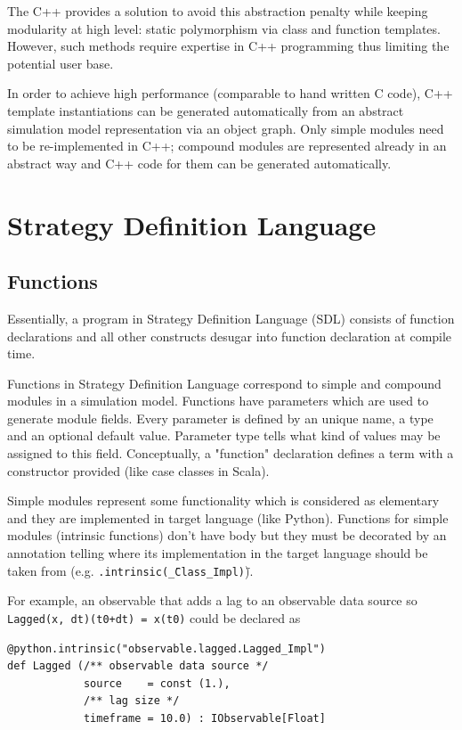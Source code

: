 \documentclass[a4paper,11pt]{article}
\begin{document}
The C++ provides a solution to avoid this abstraction penalty while keeping modularity at high level: static polymorphism via class and function templates. However, such methods require expertise in C++ programming thus limiting the potential user base.

In order to achieve high performance (comparable to hand written C code), C++ template instantiations can be generated automatically from an abstract simulation model representation via an object graph. Only simple modules need to be re-implemented in C++; compound modules are represented already in an abstract way and C++ code for them can be generated automatically.

\section{Strategy Definition Language}\label{SDL}

\subsection{Functions}

Essentially, a program in Strategy Definition Language (SDL) consists of function declarations and all other constructs desugar into function declaration at compile time.

Functions in Strategy Definition Language correspond to simple and compound modules in a simulation model. Functions have parameters which are used to generate module fields. Every parameter is defined by an unique name, a type and an optional default value. Parameter type tells what kind of values may be assigned to this field. Conceptually, a "function" declaration defines a term with a constructor provided (like case classes in Scala).

Simple modules represent some functionality which is considered as elementary and they are implemented in target language (like Python). Functions for simple modules (intrinsic functions) don't have body but they must be decorated by an annotation telling where its implementation in the target language should be taken from (e.g. \texttt{\@python.intrinsic(\"\_Class\_Impl\")}).

For example, an observable that adds a lag to an observable data source so \texttt{Lagged(x, dt)(t0+dt) = x(t0)} could be declared as

\begin{verbatim}
@python.intrinsic("observable.lagged.Lagged_Impl")
def Lagged (/** observable data source */   
            source    = const (1.),
            /** lag size */
            timeframe = 10.0) : IObservable[Float]
\end{verbatim}
\end{document}

